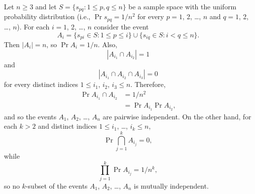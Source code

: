 Let $n\ge3$ and let $S=\{s_{pq}:1\le p,q\le n\}$ be a sample space with the uniform probability distribution (i.e., $\Pr{s_{pq}}=1/n^2$ for every $p=1$, 2, \dots, $n$ and $q=1$, 2, \dots, $n$).
For each $i=1$, 2, \dots, $n$ consider the event
\[
    A_i = \{s_{pi}\in S:1\le p\le i\}\cup\{s_{iq}\in S:i<q\le n\}.
\]
Then $|A_i|=n$, so $\Pr{A_i}=1/n$.
Also,
\[
    |A_{i_1}\cap A_{i_2}| = 1
\]
and
\[
    |A_{i_1}\cap A_{i_2}\cap A_{i_3}| = 0
\]
for every distinct indices $1\le i_1$, $i_2$, $i_3\le n$.
Therefore,
\begin{align*}
    \Pr{A_{i_1}\cap A_{i_2}} &= 1/n^2 \\
    &= \Pr{A_{i_1}}\Pr{A_{i_2}},
\end{align*}
and so the events $A_1$, $A_2$, \dots, $A_n$ are pairwise independent.
On the other hand, for each $k>2$ and distinct indices $1\le i_1$, \dots, $i_k\le n$,
\[
    \Pr{\bigcap_{j=1}^kA_{i_j}} = 0,
\]
while
\[
    \prod_{j=1}^k\Pr{A_{i_j}} = 1/n^k,
\]
so no $k$-subset of the events $A_1$, $A_2$, \dots, $A_n$ is mutually independent.
